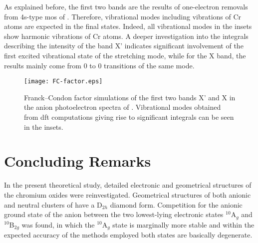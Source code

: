 \begin{refsection}
As explained before, the first two bands are the results of one-electron removals from 4s-type \acrshort{mo}s of . Therefore, vibrational modes including vibrations of Cr atoms are expected in the final states. Indeed, all vibrational modes in the insets show harmonic vibrations of Cr atoms. A deeper investigation into the integrals describing the intensity of the band X' indicates significant involvement of the first excited vibrational state of the  stretching mode, while for the X band, the results mainly come from 0 to 0 transitions of the same mode.


\begin{figure}[htb!]
	\centering
	\texttt{[image: FC-factor.eps]}
	\caption{Franck–Condon factor simulations of the first two bands X' and X in the anion photoelectron spectra of . Vibrational modes obtained from \acrshort{dft} computations giving rise to significant integrals can be seen in the insets.}
	\label{fig:FC}
\end{figure}



\section{Concluding Remarks}



In the present theoretical study, detailed electronic and geometrical structures of the chromium oxides  were reinvestigated. Geometrical structures of both anionic and neutral clusters of  have a D$_{2h}$ diamond form. Competition for the anionic ground state of the anion  between the two lowest-lying electronic states $^{10}$A$_g$ and $^{10}$B$_{2g}$ was found, in which the $^{10}$A$_g$ state is marginally more stable and within the expected accuracy of the methods employed both states are basically degenerate. 




\end{refsection}
